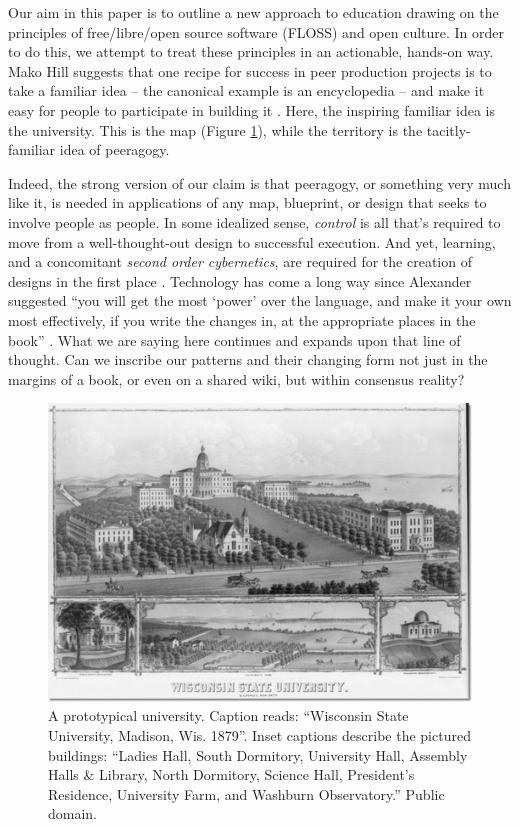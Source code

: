 Our aim in this paper is to outline a new approach to education drawing on the principles of free/libre/open source software (FLOSS) and open culture.  In order to do this, we attempt to treat these principles in an actionable, hands-on way.  Mako Hill suggests that one recipe for success in peer production projects is to take a familiar idea -- the canonical example is an encyclopedia -- and make it easy for people to participate in building it \cite{almost-wikipedia}.  Here, the inspiring familiar idea is the university.  This is the map (Figure \ref{madison-map}), while the territory is the tacitly-familiar idea of peeragogy.

Indeed, the strong version of our claim is that peeragogy, or something very much like it, is needed in applications of any map, blueprint, or design that seeks to involve people as people.  In some idealized sense, \emph{control} is all that's required to move from a well-thought-out design to successful execution.  And yet, learning, and a concomitant \emph{second order cybernetics}, are required for the creation of designs in the first place \cite{von2003cybernetics}.  Technology has come a long way since Alexander suggested ``you will get the most `power' over the language, and make it your own most effectively, if you write the changes in, at the appropriate places in the book'' \cite[p.~xl]{alexander1977pattern}.  What we are saying here continues and expands upon that line of thought.  Can we inscribe our patterns and their changing form not just in the margins of a book, or even on a shared wiki, but within consensus reality?

\begin{figure}
\vspace{-.2cm}
\begin{center}
\includegraphics[width=.5\textwidth,trim=0 30 10 2, clip=true]{wisconsin-map}
\end{center}
\vspace{-.1cm}
\caption{A prototypical university.  Caption reads: ``Wisconsin State
  University, Madison, Wis. 1879''.  Inset captions describe the
  pictured buildings: ``Ladies Hall, South Dormitory, University Hall,
  Assembly Halls \& Library, North Dormitory, Science Hall, President's
  Residence, University Farm, and Washburn Observatory.''  Public
  domain.\label{madison-map}}
\vspace{-.3cm}
\end{figure}


